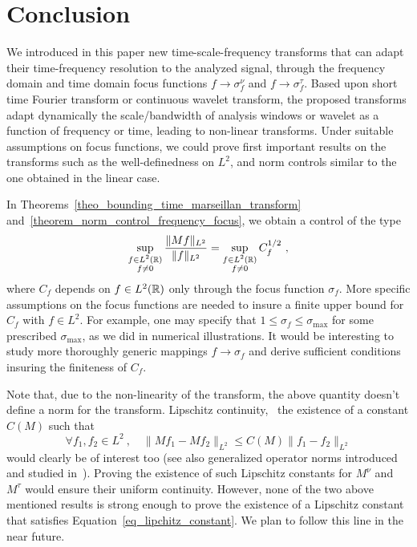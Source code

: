 \section{Conclusion}\label{sec_conclusion}

We introduced in this paper new time-scale-frequency transforms that can adapt their time-frequency resolution to the analyzed signal, through the frequency domain and time domain focus functions $f\to\sigma^\nu_f$ and $f\to\sigma^\tau_f$. Based upon short time Fourier transform or continuous wavelet transform, the proposed transforms adapt dynamically the scale/bandwidth of analysis windows or wavelet as a function of frequency or time, leading to non-linear transforms. Under suitable assumptions on focus functions, we could prove first important results on the transforms such as the well-definedness on $L^2$, and norm controls similar to the one obtained in the linear case.

In Theorems~\ref{theo_bounding_time_marseillan_transform} and~\ref{theorem_norm_control_frequency_focus}, we obtain a control of the type
\[
\sup_{\substack{f\in L^2(\mathbb{R})\\ f\ne 0}} \frac{\|Mf\|_{L^2}}{\|f\|_{L^2}} = \sup_{\substack{f\in L^2(\mathbb{R})\\ f\ne 0}} C_f^{1/2}\ ,
\]
where $C_f$ depends on $f\in L^2(\mathbb{R})$ only through the focus function $\sigma_f$. More specific assumptions on the focus functions are needed to insure a finite upper bound for $C_f$ with $f\in L^2$. For example, one may specify that $1\le\sigma_f\le\sigma_\text{max}$ for some prescribed $\sigma_\text{max}$, as we did in numerical illustrations. It would be  interesting to study more thoroughly generic mappings $f\to\sigma_f$ and derive sufficient conditions insuring the finiteness of $C_f$.

Note that, due to the non-linearity of the transform, the above quantity doesn't define a norm for the transform. Lipschitz continuity, \ie\, the existence of a constant $C(M)$ such that
\begin{equation}\label{eq_lipchitz_constant}
\forall f_1,f_2\in L^2\ ,\quad \|Mf_1 - Mf_2 \|_{L^2} \leqslant C(M)\|f_1-f_2\|_{L^2}
\end{equation}
would clearly be of interest too (see also generalized operator norms introduced and studied in~\cite{wei2020development}).
Proving the existence of such Lipschitz constants for $M^\nu$ and  $M^\tau$ would ensure their uniform continuity. 
However, none of the two above mentioned results is strong enough to prove the existence of a Lipschitz constant that satisfies Equation~\eqref{eq_lipchitz_constant}.
We plan to follow this line in the near future.

